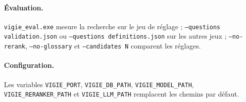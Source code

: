 \documentclass[11pt,a4paper]{article}
\begin{document}
\paragraph{Évaluation.} \texttt{vigie\_eval.exe} mesure la recherche sur le jeu de réglage ; \texttt{--questions validation.json} ou \texttt{--questions definitions.json} sur les autres jeux ; \texttt{--no-rerank}, \texttt{--no-glossary} et \texttt{--candidates N} comparent les réglages.

\paragraph{Configuration.} Les variables \texttt{VIGIE\_PORT}, \texttt{VIGIE\_DB\_PATH}, \texttt{VIGIE\_MODEL\_PATH}, \texttt{VIGIE\_RERANKER\_PATH} et \texttt{VIGIE\_LLM\_PATH} remplacent les chemins par défaut.
\end{document}
